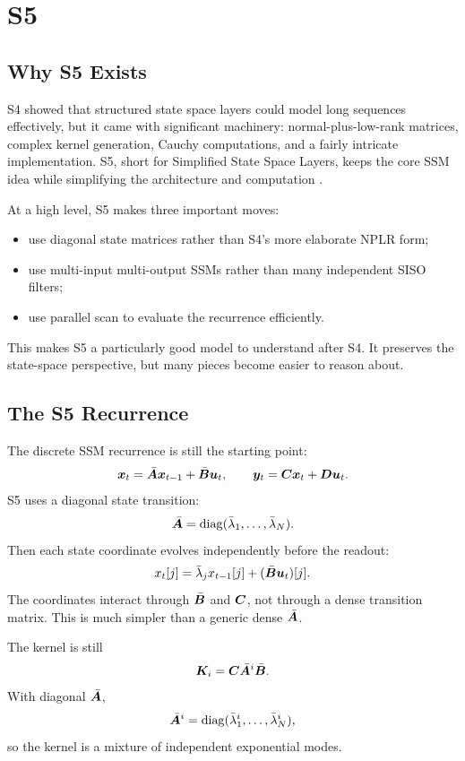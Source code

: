 \chapter{S5}
\label{ch:s5}

\section{Why S5 Exists}

S4 showed that structured state space layers could model long sequences effectively, but
it came with significant machinery: normal-plus-low-rank matrices, complex kernel
generation, Cauchy computations, and a fairly intricate implementation. S5, short for
Simplified State Space Layers, keeps the core SSM idea while simplifying the architecture
and computation \citep{smith2023s5}.

At a high level, S5 makes three important moves:

\begin{itemize}
  \item use diagonal state matrices rather than S4's more elaborate NPLR form;
  \item use multi-input multi-output SSMs rather than many independent SISO filters;
  \item use parallel scan to evaluate the recurrence efficiently.
\end{itemize}

This makes S5 a particularly good model to understand after S4. It preserves the
state-space perspective, but many pieces become easier to reason about.

\section{The S5 Recurrence}

The discrete SSM recurrence is still the starting point:
\[
  \bm{x}_t = \bar{\bm{A}}\bm{x}_{t-1} + \bar{\bm{B}}\bm{u}_t,
  \qquad
  \bm{y}_t = \bm{C}\bm{x}_t + \bm{D}\bm{u}_t.
\]
S5 uses a diagonal state transition:
\[
  \bar{\bm{A}} = \operatorname{diag}(\bar{\lambda}_1,\ldots,\bar{\lambda}_N).
\]
Then each state coordinate evolves independently before the readout:
\[
  x_t[j] = \bar{\lambda}_j x_{t-1}[j] + (\bar{\bm{B}}\bm{u}_t)[j].
\]
The coordinates interact through $\bar{\bm{B}}$ and $\bm{C}$, not through a dense transition
matrix. This is much simpler than a generic dense $\bar{\bm{A}}$.

The kernel is still
\[
  \bm{K}_i = \bm{C}\bar{\bm{A}}^i\bar{\bm{B}}.
\]
With diagonal $\bar{\bm{A}}$,
\[
  \bar{\bm{A}}^i
  =
  \operatorname{diag}(\bar{\lambda}_1^i,\ldots,\bar{\lambda}_N^i),
\]
so the kernel is a mixture of independent exponential modes.

